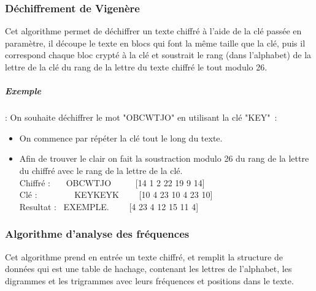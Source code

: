 \documentclass[11pt]{article}
\begin{document}
\subsubsection{Déchiffrement de Vigenère}
Cet algorithme permet de déchiffrer un texte chiffré à l’aide de la clé passée en paramètre, il découpe le texte en blocs qui font la même taille que la clé, puis il  correspond chaque bloc crypté à la clé et soustrait le rang (dans l’alphabet) de la lettre de la clé  du rang de la lettre du texte chiffré le tout modulo 26.
\subparagraph{Exemple}: 
On souhaite déchiffrer le mot "OBCWTJO" en utilisant la clé "KEY" :\\
\begin{itemize}[label=\textbullet]
\item On commence par répéter la clé tout le long du texte. 
\item Afin de trouver le clair on fait la soustraction modulo 26 du rang de la lettre du chiffré avec le rang de la lettre de la clé.\\ \newpage
Chiffré :   \ \ \  OBCWTJO \ \ \ \ \  [14 1 2 22 19 9 14] \\ 
Clé : \  \ \ \ \ \ \ \ KEYKEYK \ \ \ \  [10 4 23 10 4 23 10] \\
Resultat :  \ EXEMPLE. \ \ \ \  [4 23 4 12 15 11 4]
\end{itemize}



\subsubsection{Algorithme d’analyse des fréquences}
Cet algorithme prend en entrée un texte chiffré, et remplit la structure de données qui est une table de hachage, contenant les lettres de l’alphabet, les digrammes et les trigrammes avec leurs fréquences et positions dans le texte.
\end{document}
